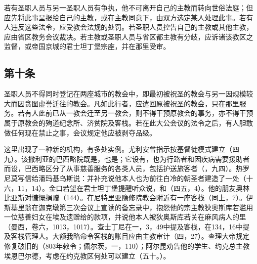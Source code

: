 若有圣职人员与另一圣职人员有争执，他不可离开自己的主教而转向世俗法庭；但应先将此事呈报给自己的主教，或在主教同意下，由双方选定某人处理此事。若有人违反这些法令，应受教会法规的处罚。若圣职人员控告自己的主教或其他主教，应由省区教务会议裁决。若主教或圣职人员与省区都主教有分歧，应诉诸该教区之监督，或帝国京城的君士坦丁堡宗座，并在那里受审。\par


\subsection{第十条}

圣职人员不得同时登记在两座城市的教会中，即最初被祝圣的教会与另一因规模较大而因贪图虚誉迁往的教会。凡如此行者，应遣回原被祝圣的教会，只在那里服务。若有人此前已从一教会迁至另一教会，则不得干预原教会的事务，亦不得干预属于原教会的殉道纪念所、济贫院及客栈。若在此大公会议的法令之后，有人胆敢做任何现在禁止之事，会议规定他应被剥夺品级。\par

这里出现了一种新的机构，有多处实例。尤利安曾指示按基督徒模式建立（四九）。该撒利亚的巴西略院既是，也是；它设有，也为行路者和因疾病需要援助者而设，巴西略区分了从事慈善服务的各类人员，包括护送旅客者（，九四）。热罗尼莫写信给潘玛基乌斯说：并补充说他本人也为前往白冷的朝圣者建造了一处（十六，11，14）。金口若望在君士坦丁堡提醒听众说，和（四五，4）。他的朋友奥林比亚斯对慷慨捐赠（144）。在尼特里亚隐修院教会附近有一座客栈（同上，7）。伊斯基里翁在迦克墩第三次会议上宣读的备忘录中，抱怨他的宗主教狄奥斯库若滥用一位慈善妇女在埃及遗赠给的款项，并说他本人被狄奥斯库若关在麻风病人的里（曼西，卷六，1013，1017）。查士丁尼在一，3，49中提及客栈，在134，16中提及客栈管理人。大额我略命令客栈的账目应由主教审计（四，27）。查理大帝规定修复破旧的（803年敕令；佩尔茨，一，110）；阿尔昆劝告他的学生、约克总主教埃恩巴尔德，考虑在约克教区何处可以建立（五十。）。\par

